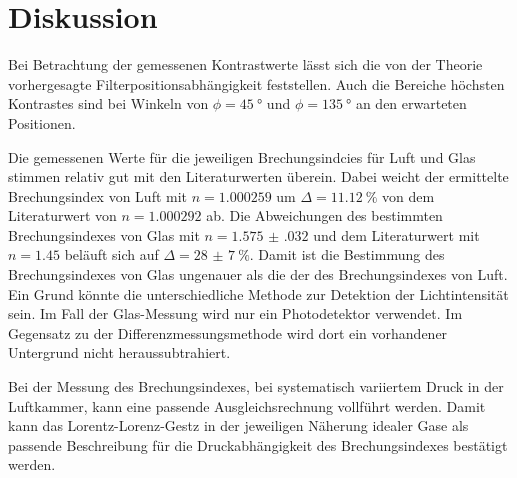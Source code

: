 \section{Diskussion}
\label{sec:Diskussion}


Bei Betrachtung der gemessenen Kontrastwerte lässt sich die von der Theorie vorhergesagte Filterpositionsabhängigkeit feststellen. 
Auch die Bereiche höchsten Kontrastes sind bei Winkeln von $\phi = \SI{45}{\degree}$ und $\phi = \SI{135}{\degree}$ an den erwarteten Positionen.


Die gemessenen Werte für die jeweiligen Brechungsindcies für Luft und Glas stimmen relativ gut mit den Literaturwerten überein.
Dabei weicht der ermittelte Brechungsindex von Luft mit $n = \num{1.000259}$ um $\Delta = \SI{11.12}{\percent}$ von dem Literaturwert \cite{Dem2} von $n = \num{1.000292}$ ab.
Die Abweichungen des bestimmten Brechungsindexes von Glas mit $n = \num{1.575(032)}$ und dem Literaturwert \cite{Dem2} mit $n = \num{1.45}$ beläuft sich auf $\Delta = \SI{28(7)}{\percent}$.
Damit ist die Bestimmung des Brechungsindexes von Glas ungenauer als die der des Brechungsindexes von Luft. 
Ein Grund könnte die unterschiedliche Methode zur Detektion der Lichtintensität sein. 
Im Fall der Glas-Messung wird nur ein Photodetektor verwendet. 
Im Gegensatz zu der Differenzmessungsmethode wird dort ein vorhandener Untergrund nicht heraussubtrahiert.


Bei der Messung des Brechungsindexes, bei systematisch variiertem Druck in der Luftkammer, kann eine passende Ausgleichsrechnung vollführt werden. 
Damit kann das Lorentz-Lorenz-Gestz in der jeweiligen Näherung idealer Gase als passende Beschreibung für die Druckabhängigkeit des Brechungsindexes bestätigt werden.


